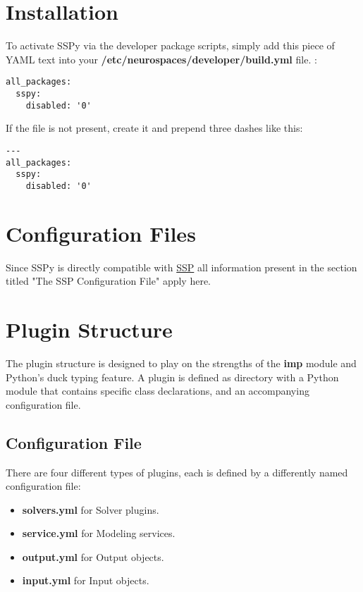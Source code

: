 \documentclass[12pt]{article}
\begin{document}
\section*{Installation}

To activate SSPy via the developer package scripts, simply add this piece of YAML text into your {\bf /etc/neurospaces/developer/build.yml} file. :

\begin{verbatim}
all_packages:
  sspy:
    disabled: '0'
\end{verbatim}

If the file is not present, create it and prepend three dashes like this:

\begin{verbatim}
---
all_packages:
  sspy:
    disabled: '0'
\end{verbatim}



\section*{Configuration Files}

Since SSPy is directly compatible with \href{../ssp/ssp.tex}{SSP} all information present in the section titled "The SSP Configuration File" apply here. 

\section*{Plugin Structure}

The plugin structure is designed to play on the strengths of the {\bf imp} module and Python's duck typing feature. A plugin is defined as directory with a Python module that contains specific class declarations, and an accompanying configuration file. 

\subsection*{Configuration File}

There are four different types of plugins, each is defined by a differently named configuration file:

\begin{itemize}
	\item[] {\bf solvers.yml} for Solver plugins.
	\item[] {\bf service.yml} for Modeling services.
	\item[] {\bf output.yml} for Output objects.
	\item[] {\bf input.yml} for Input objects.
\end{itemize}
\end{document}
